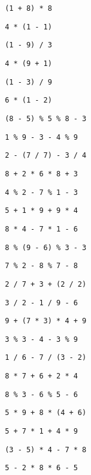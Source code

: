 \begin{exercise}
\begin{sltasks}[resume=true]
\begin{items}
        \item \texttt{ (1 + 8) * 8 }
    \end{items}
    \task
    \begin{items}
        \item \texttt{ 4 * (1 - 1) }
        \item \texttt{ (1 - 9) / 3 }
        \item \texttt{ 4 * (9 + 1) }
        \item \texttt{ (1 - 3) / 9 }
        \item \texttt{ 6 * (1 - 2) }
    \end{items}
    \task
    \begin{items}
        \item \texttt{ (8 - 5) \% 5 \% 8 - 3 }
        \item \texttt{ 1 \% 9 - 3 - 4 \% 9 }
        \item \texttt{ 2 - (7 / 7) - 3 / 4 }
        \item \texttt{ 8 + 2 * 6 * 8 + 3 }
        \item \texttt{ 4 \% 2 - 7 \% 1 - 3 }
    \end{items}
    \task
    \begin{items}
        \item \texttt{ 5 + 1 * 9 + 9 * 4 }
        \item \texttt{ 8 * 4 - 7 * 1 - 6 }
        \item \texttt{ 8 \% (9 - 6) \% 3 - 3 }
        \item \texttt{ 7 \% 2 - 8 \% 7 - 8 }
        \item \texttt{ 2 / 7 + 3 + (2 / 2) }
    \end{items}
    \task
    \begin{items}
        \item \texttt{ 3 / 2 - 1 / 9 - 6 }
        \item \texttt{ 9 + (7 * 3) * 4 + 9 }
        \item \texttt{ 3 \% 3 - 4 - 3 \% 9 }
        \item \texttt{ 1 / 6 - 7 / (3 - 2) }
        \item \texttt{ 8 * 7 + 6 + 2 * 4 }
    \end{items}
    \task
    \begin{items}
        \item \texttt{ 8 \% 3 - 6 \% 5 - 6 }
        \item \texttt{ 5 * 9 + 8 * (4 + 6) }
        \item \texttt{ 5 + 7 * 1 + 4 * 9 }
        \item \texttt{ (3 - 5) * 4 - 7 * 8 }
        \item \texttt{ 5 - 2 * 8 * 6 - 5 }
    \end{items}
\end{sltasks}
\end{exercise}

